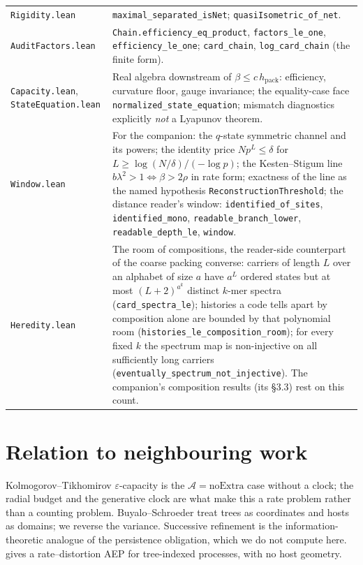 \documentclass[11pt,a4paper]{article}
\theoremstyle{plain}
\theoremstyle{definition}
\theoremstyle{remark}
\newcommand{\hpack}{h_{\mathrm{pack}}}
\begin{document}
{\begin{longtable}{@{}>{\raggedright\arraybackslash}p{4.3cm}>{\raggedright\arraybackslash}p{10.6cm}@{}}
\texttt{Rigidity.lean} & \texttt{maximal\_separated\_isNet}; \texttt{quasiIsometric\_of\_net}. \\
\texttt{AuditFactors.lean} & \texttt{Chain.efficiency\_eq\_product}, \texttt{factors\_le\_one}, \texttt{efficiency\_le\_one}; \texttt{card\_chain}, \texttt{log\_card\_chain} (the finite form). \\
\texttt{Capacity.lean}, \texttt{StateEquation.lean} & Real algebra downstream of $\beta\le c\,\hpack$: efficiency, curvature floor, gauge invariance; the equality-case face \texttt{normalized\_state\_equation}; mismatch diagnostics explicitly \emph{not} a Lyapunov theorem. \\
\texttt{Window.lean} & For the companion: the $q$-state symmetric channel and its powers; the identity price $Np^L\le\delta$ for $L\ge\log(N/\delta)/(-\log p)$; the Kesten--Stigum line $b\lambda^2>1\iff\beta>2\rho$ in rate form; exactness of the line as the named hypothesis \texttt{ReconstructionThreshold}; the distance reader's window: \texttt{identified\_of\_sites}, \texttt{identified\_mono}, \texttt{readable\_branch\_lower}, \texttt{readable\_depth\_le}, \texttt{window}. \\
\texttt{Heredity.lean} & The room of compositions, the reader-side counterpart of the coarse packing converse: carriers of length $L$ over an alphabet of size $a$ have $a^L$ ordered states but at most $(L+2)^{a^k}$ distinct $k$-mer spectra (\texttt{card\_spectra\_le}); histories a code tells apart by composition alone are bounded by that polynomial room (\texttt{histories\_le\_composition\_room}); for every fixed $k$ the spectrum map is non-injective on all sufficiently long carriers (\texttt{eventually\_spectrum\_not\_injective}). The companion's composition results (its \S3.3) rest on this count. \\
\bottomrule
\end{longtable}}

\section{Relation to neighbouring work}

Kolmogorov--Tikhomirov $\varepsilon$-capacity is the $\mathcal A=\mathrm{noExtra}$
case without a clock; the radial budget and the generative clock are what make
this a rate problem rather than a counting problem. Buyalo--Schroeder
\cite{BuyaloSchroeder} treat trees as coordinates and hosts as domains; we
reverse the variance. Successive refinement \cite{EquitzCover} is the
information-theoretic analogue of the persistence obligation, which we do not
compute here. \cite{DokuAmponsah} gives a rate--distortion AEP for
tree-indexed processes, with no host geometry.
\end{document}
